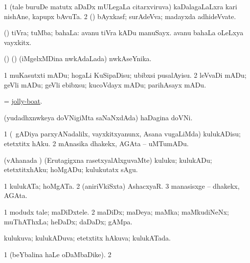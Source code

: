 \noindent
\gl{\pagu}
\bmng
\bnum
\num{1}  (tale buruDe matutx aDaDx mULegaLa citarxviruva) kaDalagaLaLxra kari nishAne, kapupx bAvuTa. 
\num{2}  (\girxVpu) bAyxkasf; surAdeVva; madayxda adhideVvate. 
\enum
\emng
\eentry

\bentry
{}
\gl{\kirxvi}
\bmng
(\AmA) tiVra; tuMba; bahaLa:  avanu tiVra kADu manuSayx.  avanu bahaLa oLeLxya vayxkitx. 
\emng
\eentry

\bentry
{}
\gl{\nA}
\bmng
(\birx) (\ashi) (iMgelxMDina nwkAdaLada) nwkAseYnika. 
\emng
\eentry

\bentry
{}
\gl{\sakirx}
\bmng
\bnum
\num{1} muKasutxti mADu; hogaLi KuSipaDisu; ubibxsi pusalAyisu. 
\num{2} leVvaDi mADu; geVli mADu; geVli ebibxsu; kucoVdayx mADu; parihAsayx mADu. 
\enum
\emng
\eentry

\bentry
{}
\gl{\nA}
\bmng
 = \hyperlink{jolly-boat}{jolly-boat}. 
\emng
\eentry

\bentry
{}
\gl{\nA}
\bmng
(yudadhxnwkeya doVNigiMta saNaNxdAda) haDagina doVNi. 
\emng
\eentry

\bentry
{}
\gl{\sakirx}
\bmng
\bnum
\num{1} (\kanmu\ gADiya parxyANadalilx, vayxkitxyanunx, Asana \mo vugaLiMda) kulukADisu; etetxtitx hAku. 
\num{2} mAnasika dhakekx, AGAta -- uMTumADu. 
\enum
\emng

\noindent
\gl{\akirx}
\bmng
(vAhanada \vi) (Erutagigxna rasetxyalAlxguvaMte) kuluku; kulukADu; etetxtitxhAku; hoMgADu; kulukutatx sAgu. 
\emng
\eentry

\bentry
{}
\gl{\nA}
\bmng
\bnum
\num{1} kulukATa; hoMgATa. 
\num{2} (aniriVkiSxta) AshacxyaR. 
\num{3} manasisxge -- dhakekx, AGAta. 
\enum
\emng
\eentry

\bentry
{}
\gl{\nA}
\bmng
\bnum
\num{1} modudx tale; maDiDxtele. 
\num{2} maDiDx; maDeya; maMka; maMkudiNeNx; muThAThxLa; heDaDx; daDaDx; gAMpa. 
\enum
\emng
\eentry

\bentry
{}
\gl{\gu}
\bmng
kulukuva; kulukADuva; etetxtitx hAkuva; kulukATada. 
\emng
\eentry

\bentry
{}
\gl{\saMkiSx}
\bmng
\bnum
\num{1}  (beYbalina haLe oDaMbaDike). 
\num{2}  
\enum
\emng
\eentry


